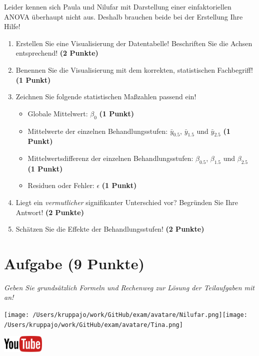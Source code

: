 \documentclass[a4paper, 9pt]{scrartcl}\usepackage[]{graphicx}\usepackage[]{xcolor}
\begin{document}
Leider kennen sich Paula und Nilufar mit Darstellung einer einfaktoriellen ANOVA überhaupt nicht aus. Deshalb brauchen beide bei der Erstellung Ihre Hilfe! 

\begin{enumerate}
\item Erstellen  Sie  eine  Visualisierung  der  Datentabelle! Beschriften  Sie  die  Achsen  entsprechend! \textbf{(2 Punkte)}
\item Benennen Sie die Visualisierung mit dem korrekten, statistischen Fachbegriff! \textbf{(1 Punkt)}
\item Zeichnen Sie folgende statistischen Maßzahlen passend ein! 
  \begin{itemize}
  \item Globale Mittelwert: $\beta_0$ \textbf{(1 Punkt)}
  \item Mittelwerte der einzelnen Behandlungsstufen: $\bar{y}_{0.5}$, $\bar{y}_{1.5}$ und $\bar{y}_{2.5}$ \textbf{(1 Punkt)}
  \item Mittelwertsdifferenz der einzelnen Behandlungsstufen: $\beta_{0.5}$, $\beta_{1.5}$ und $\beta_{2.5}$ \textbf{(1 Punkt)}
  \item Residuen oder Fehler: $\epsilon$ \textbf{(1 Punkt)}
  \end{itemize}
\item Liegt ein \textit{vermutlicher} signifikanter Unterschied vor? Begründen Sie Ihre Antwort! \textbf{(2 Punkte)}
\item Schätzen Sie die Effekte der Behandlungsstufen! \textbf{(2 Punkte)}
\end{enumerate}
 
\clearpage

\section{Aufgabe \hfill (9 Punkte)}

\textit{Geben Sie grundsätzlich Formeln und Rechenweg zur Lösung der Teilaufgaben mit an!} \\[1Ex]
 

 
\begin{minipage}[t]{0.5\textwidth}
\texttt{[image: /Users/kruppajo/work/GitHub/exam/avatare/Nilufar.png]}\hspace{-4mm}\texttt{[image: /Users/kruppajo/work/GitHub/exam/avatare/Tina.png]}
\end{minipage}
\begin{minipage}[t]{0.5\textwidth}
\hfill
\href{https://youtu.be/IhecxMcCENY}{\includegraphics[width = 2cm]{img/youtube}}
\end{minipage}
\vspace{1ex}
\end{document}
